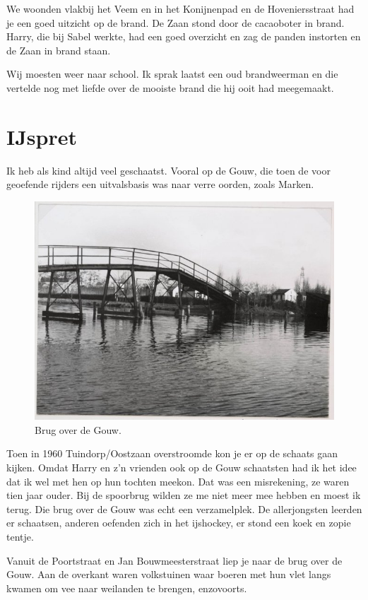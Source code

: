 \documentclass[10pt,twoside, openright]{memoir}
\begin{document}
We woonden vlakbij het Veem en in het Konijnenpad en de Hoveniersstraat had je een goed uitzicht op de brand. De Zaan stond door de cacaoboter in brand. Harry, die bij Sabel werkte, had een goed overzicht en zag de panden instorten en de Zaan in brand staan.

Wij moesten weer naar school. Ik sprak laatst een oud brandweerman en die vertelde nog met liefde over de mooiste brand die hij ooit had meegemaakt. 

\section{IJspret} %
\label{cha:ijspret}

Ik heb als kind altijd veel geschaatst. Vooral op de Gouw, die toen de voor geoefende rijders een uitvalsbasis was naar verre oorden, zoals Marken.

\begin{figure}
\includegraphics[width=\textwidth]{img/84bruggouw}
\caption*{\footnotesize Brug over de Gouw.}
\end{figure}

Toen in 1960 Tuindorp/Oostzaan overstroomde kon je er op de schaats gaan kijken. Omdat Harry en z’n vrienden ook op de Gouw schaatsten had ik het idee dat ik wel met hen op hun tochten meekon. Dat was een misrekening, ze waren tien jaar ouder. Bij de spoorbrug wilden ze me niet meer mee hebben en moest ik terug. Die brug over de Gouw was echt een verzamelplek. De allerjongsten leerden er schaatsen, anderen oefenden zich in het ijshockey, er stond een koek en zopie tentje.

Vanuit de Poortstraat en Jan Bouwmeesterstraat liep je naar de brug over de Gouw. Aan de overkant waren volkstuinen waar boeren met hun vlet langs kwamen om vee naar weilanden te brengen, enzovoorts. 
\end{document}
